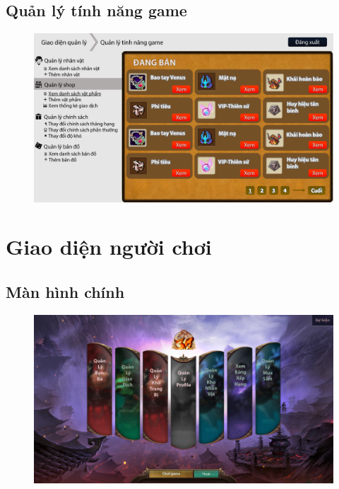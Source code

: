 \documentclass[3p]{elsarticle}
\begin{document}
\subsection{Quản lý tính năng game}
\begin{figure}[!htbp]
	\centering
	\includegraphics[scale=.4]{images/shopmanagement.pdf}
\end{figure}
\newpage
\section{Giao diện người chơi}
\subsection{Màn hình chính}
\begin{figure}[!htbp]
	\centering
	\includegraphics[scale=.3]{images/main_screen.pdf}
\end{figure}
\end{document}
